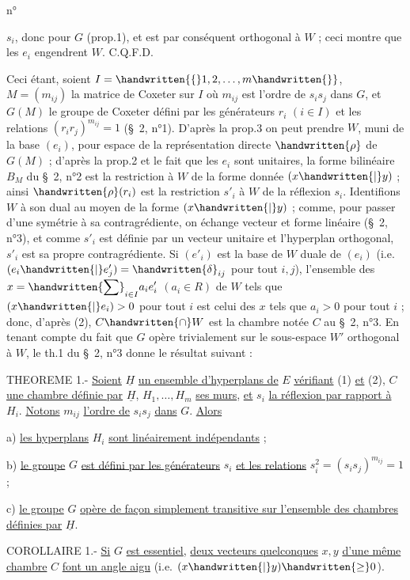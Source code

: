 \begin{flushright}n° \end{flushright}
$s_i$, donc pour $G$ (prop.1), et est par conséquent orthogonal à $W$ ; ceci montre que les $e_i$ engendrent $W$. C.Q.F.D.

Ceci étant, soient $I=\handwritten{\{}1,2,\ldots,m\handwritten{\}}$, $M=(m_{ij})$ la matrice de Coxeter sur $I$ où $m_{ij}$ est l'ordre de $s_i s_j$ dans $G$, et $G(M)$ le groupe de Coxeter défini par les générateurs $r_i$ $(i\in I)$ et les relations $(r_i r_j)^{m_{ij}}=1$ (\S\ 2, n°1). D'après la prop.3 on peut prendre $W$, muni de la base $(e_i)$, pour espace de la représentation directe $\handwritten{\rho}$ de $G(M)$ ; d'après la prop.2 et le fait que les $e_i$ sont unitaires, la forme bilinéaire $B_M$ du \S\ 2, n°2 est la restriction à $W$ de la forme donnée $(x\handwritten{|}y)$ ; ainsi $\handwritten{\rho}(r_i)$ est la restriction $s'_i$ à $W$ de la réflexion $s_i$. Identifions $W$ à son dual au moyen de la forme $(x\handwritten{|}y)$ ; comme, pour passer d'une symétrie à sa contragrédiente, on échange vecteur et forme linéaire (\S\ 2, n°3), et comme $s'_i$ est définie par un vecteur unitaire et l'hyperplan orthogonal, $s'_i$ est sa propre contragrédiente. Si $(e'_i)$ est la base de $W$ duale de $(e_i)$ (i.e. $(e_i\handwritten{|}e'_j)=\handwritten{\delta}_{ij}$ pour tout $i,j$), l'ensemble des $\displaystyle x=\handwritten{\sum}_{i\in I}a_i e'_i$ $(a_i\in R)$ de $W$ tels que $(x\handwritten{|}e_i)>0$ pour tout $i$ est celui des $x$ tels que $a_i>0$ pour tout $i$ ; donc, d'après (2), $C\handwritten{\cap}W$ est la chambre notée $C$ au \S\ 2, n°3. En tenant compte du fait que $G$ opère trivialement sur le sous-espace $W'$ orthogonal à $W$, le th.1 du \S\ 2, n°3 donne le résultat suivant :

THEOREME 1.- \uline{Soient} $\underline{H}$ \uline{un ensemble d'hyperplans de} $E$ \uline{vérifiant} (1) \uline{et} (2), $C$ \uline{une chambre définie par} $\underline{H}$, $H_1,\ldots,H_m$ \uline{ses murs}, \uline{et} $s_i$ \uline{la réflexion par rapport à} $H_i$. \uline{Notons} $m_{ij}$ \uline{l'ordre de} $s_i s_j$ \uline{dans} $G$. \uline{Alors}

a) \uline{les hyperplans} $H_i$ \uline{sont linéairement indépendants} ;

b) \uline{le groupe} $G$ \uline{est défini par les générateurs} $s_i$ \uline{et les relations} $s_i^2=(s_i s_j)^{m_{ij}}=1$;

c) \uline{le groupe} $G$ \uline{opère de façon simplement transitive sur l'ensemble des chambres définies par} $\underline{H}$.

COROLLAIRE 1.- \uline{Si} $G$ \uline{est essentiel}, \uline{deux vecteurs quelconques} $x,y$ \uline{d'une même chambre} $C$ \uline{font un angle aigu} (i.e. $(x\handwritten{|}y)\handwritten{\geq}0$).
